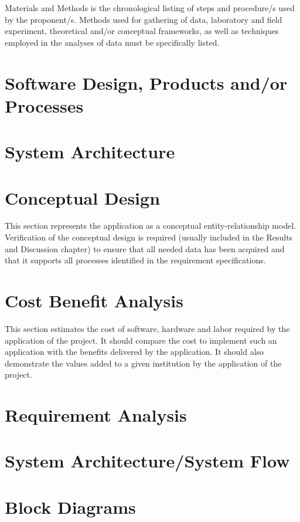 Materials and Methods is the chronological listing of steps and procedure/s used by the proponent/s. Methods used for gathering of data, laboratory and field experiment, theoretical and/or conceptual frameworks, as well as techniques employed in the analyses of data must be specifically listed. 

\section{Software Design, Products and/or Processes}


\section{System Architecture}


\section{Conceptual Design}
This section represents the application as a conceptual entity-relationship model. Verification of the conceptual design is required (usually included in the Results and Discussion chapter) to ensure that all needed data has been acquired and that it supports all processes identified in the requirement specifications.

\section{Cost Benefit Analysis}
This section estimates the cost of software, hardware and labor required by the application of the project. It should compare the cost to implement such an application with the benefits delivered by the application. It should also demonstrate the values added to a given institution by the application of the project.

\section{Requirement Analysis}

\section{System Architecture/System Flow}

\section{Block Diagrams}

